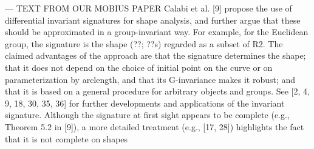\documentclass[review,onefignum,onetabnum]{siamonline190516}
\begin{document}
---
TEXT FROM OUR MOBIUS PAPER
Calabi et al. [9] propose the use of differential invariant signatures for shape analysis, and further
argue that these should be approximated in a group-invariant way. For example, for the Euclidean
group, the signature is the shape  (??; ??s) regarded as a subset of R2. The claimed advantages
of the approach are that the signature determines the shape; that it does not depend on the
choice of initial point on the curve or on parameterization by arclength, and that its G-invariance
makes it robust; and that it is based on a general procedure for arbitrary objects and groups.
See [2, 4, 9, 18, 30, 35, 36] for further developments and applications of the invariant signature.
Although the signature at first sight appears to be complete (e.g., Theorem 5.2 in [9]),
a more detailed treatment (e.g., [17, 28]) highlights the fact that it is not complete on shapes
\end{document}
